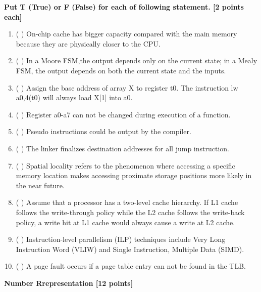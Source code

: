 \documentclass[addpoints, 12pt, answers]{exam}
\begin{document}
\begin{questions}

\question[20] \textbf{Put T (True) or F (False) for each of following statement. [2 points each]}

\begin{enumerate}[(1)]
    \item ( \quad ) On-chip cache has bigger capacity compared with the main memory because they are physically closer to the CPU.

    \item ( \quad ) In a Moore FSM,the output depends only on the current state; in a Mealy FSM, the output depends on both the current state and the inputs.
    
    \item ( \quad ) Assign the base address of array X to register t0. The instruction lw a0,4(t0) will always load X[1] into a0.

    \item ( \quad ) Register a0-a7 can not be changed during execution of a function.

    \item ( \quad ) Pseudo instructions could be output by the compiler.

    \item ( \quad ) The linker finalizes destination addresses for all jump instruction.

    \item ( \quad ) Spatial locality refers to the phenomenon where accessing a specific memory location makes accessing proximate storage positions more likely in the near future.

    \item ( \quad ) Assume that a processor has a two-level cache hierarchy. If L1 cache follows the write-through policy while the L2 cache follows the write-back policy, a write hit at L1 cache would always cause a write at L2 cache. 

    \item ( \quad ) Instruction-level parallelism (ILP) techniques include Very Long Instruction Word (VLIW) and Single Instruction, Multiple Data (SIMD).

    \item ( \quad ) A page fault occurs if a page table entry can not be found in the TLB.
    
\end{enumerate}

\pagebreak

\question \textbf{Number Rrepresentation [12 points]}
\begin{parts}


\end{parts}
\end{questions}
\end{document}
